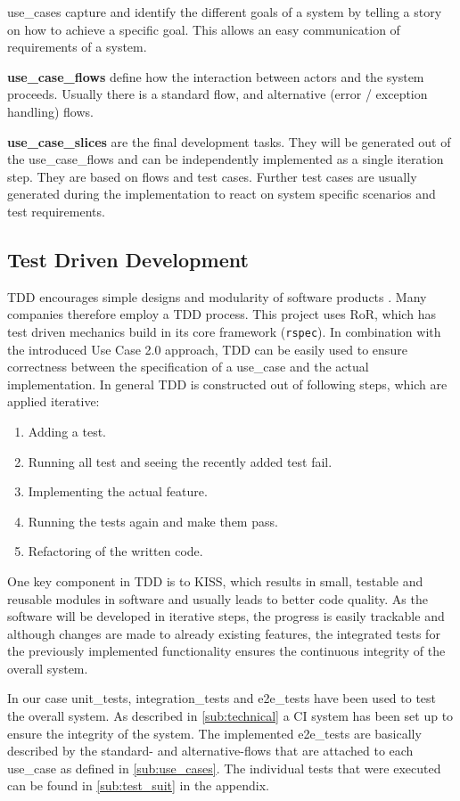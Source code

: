 \Glspl{use_case} capture and identify the different goals of a system by telling a story on how to achieve a specific goal. This allows an easy communication of requirements of a system. \cite{jacobson2011usecase}

\textbf{\Glspl{use_case_flow}} define how the interaction between actors and the system proceeds. Usually there is a standard flow, and alternative (error / exception handling) flows. 

\textbf{\Glspl{use_case_slice}} are the final development tasks. They will be generated out of the \glspl{use_case_flow} and can be independently implemented as a single iteration step. They are based on flows and test cases. Further test cases are usually generated during the implementation to react on system specific scenarios and test requirements.


\subsection{Test Driven Development}
\label{sec:tdd}
\Gls{TDD} encourages simple designs and modularity of software products \cite{tdd}. Many companies therefore employ a \gls{TDD} process. This project uses \gls{RoR}, which has test driven mechanics build in its core framework (\texttt{rspec}). In combination with the introduced Use Case 2.0 approach, \gls{TDD} can be easily used to ensure correctness between the specification of a \gls{use_case} and the actual implementation. In general \gls{TDD} is constructed out of following steps, which are applied iterative: 

\begin{enumerate}
	\item Adding a test.
	\item Running all test and seeing the recently added test fail.
	\item Implementing the actual feature.
	\item Running the tests again and make them pass.
	\item Refactoring of the written code.
\end{enumerate}


One key component in \gls{TDD} is to \gls{KISS}, which results in small, testable and reusable modules in software and usually leads to better code quality. As the software will be developed in iterative steps, the progress is easily trackable and although changes are made to already existing features, the integrated tests for the previously implemented functionality ensures the continuous integrity of the overall system.  

In our case \glspl{unit_test}, \glspl{integration_test} and \glspl{e2e_test} have been used to test the overall system. As described in \autoref{sub:technical} a \gls{CI} system has been set up to ensure the integrity of the system. The implemented \glspl{e2e_test} are basically described by the standard- and alternative-flows that are attached to each \gls{use_case} as defined in \autoref{sub:use_cases}. The individual tests that were executed can be found in \autoref{sub:test_suit} in the appendix.


